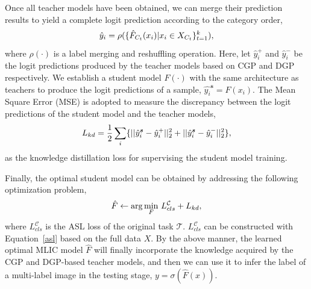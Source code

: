 \documentclass{article}
\begin{document}
Once all teacher models have been obtained, we can merge their prediction results to yield a complete logit prediction according to the category order,
\begin{equation}\label{}
\setlength{\abovedisplayskip}{1mm}
\setlength{\belowdisplayskip}{1mm}
\hat{y}_i=\rho(\{\hat{F}_{C_t}(x_i)|x_i\in X_{C_t}\}_{t=1}^k),
\end{equation}
where $\rho(\cdot)$ is a label merging and reshuffling operation. Here, let $\hat{y}_i^+$ and $\hat{y}_i^-$ be the logit predictions produced by the teacher models based on CGP and DGP respectively.
We establish a student model $F(\cdot)$ with the same architecture as teachers to produce the logit predictions of a sample, $\hat{y_i}^{\bm{s}}=F(x_i)$.
The Mean Square Error (MSE) is adopted to measure the discrepancy between the logit predictions of the student model and the teacher models,
\begin{equation}
\setlength{\abovedisplayskip}{1mm}
\setlength{\belowdisplayskip}{1mm}
    L_{kd} = \frac{1}{2}\sum_{i}\{||\hat{y}_i^{\bm{s}}-\hat{y}_i^+||_2^2+||\hat{y}_i^{\bm{s}}-\hat{y}_i^-||^2_2\},
\end{equation}
as the knowledge distillation loss for supervising the student model training.

Finally, the optimal student model can be obtained by addressing the following optimization problem,
\begin{equation}\label{student_train}
\setlength{\abovedisplayskip}{3pt}
\setlength{\belowdisplayskip}{1mm}
\hat{F}\leftarrow\arg\underset{F}\min~L^{\mathcal{C}}_{cls}+L_{kd},
\end{equation}
where $L^{\mathcal{C}}_{cls}$ is the ASL loss of the original task $\mathcal{T}$. $L^{\mathcal{C}}_{cls}$ can be constructed with Equation~\ref{asl} based on the full data $X$.
By the above manner, the learned optimal MLIC model $\hat{F}$ will finally incorporate the knowledge acquired by the CGP and DGP-based teacher models, and then we can use it to infer the label of a multi-label image in the testing stage, $y=\sigma(\hat{F}(x))$.

\end{document}
